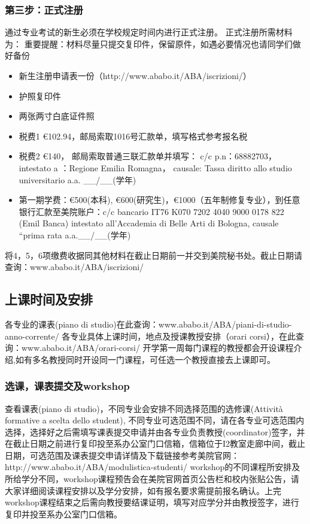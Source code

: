 \documentclass[3pt,a5paper,openright,twoside]{book}
\begin{document}
\subsubsection{第三步：正式注册}
通过专业考试的新生必须在学校规定时间内进行正式注册。
正式注册所需材料为：
重要提醒：材料尽量只提交复印件，保留原件，如遇必要情况也请同学们做好备份

\begin{itemize}
  \item 新生注册申请表一份（http://www.ababo.it/ABA/iscrizioni/）
  \item 护照复印件
  \item 两张两寸白底证件照
  \item 税费1 €102.94，邮局索取1016号汇款单，填写格式参考报名税
  \item 税费2 €140， 邮局索取普通三联汇款单并填写：                                                              c/c p.n：68882703，intestato a ：Regione Emilia Romagna， causale: Tassa diritto allo studio universitario a.a. \_\_/\_\_(学年)
  \item 第一期学费：€500(本科), €600(研究生)，€1000（五年制修复专业），到任意银行汇款至美院账户：c/c bancario IT76 K070 7202 4040 9000 0178 822 (Emil Banca) intestato all’Accademia di Belle Arti di Bologna, causale “prima rata a.a.\_\_/\_\_(学年)
 \end{itemize}

 将4，5，6项缴费收据同其他材料在截止日期前一并交到美院秘书处。截止日期请查询：www.ababo.it/ABA/iscrizioni/


\subsection{上课时间及安排}
各专业的课表(piano di studio)在此查询：www.ababo.it/ABA/piani-di-studio-anno-corrente/ 
各专业具体上课时间，地点及授课教授安排（orari corsi），在此查询：www.ababo.it/ABA/orari-corsi/
开学第一周每门课程的教授都会开设课程介绍,如有多名教授同时开设同一门课程，可任选一个教授直接去上课即可。


\subsubsection{选课，课表提交及workshop}
查看课表(piano di studio)，不同专业会安排不同选择范围的选修课(Attività formative a scelta dello student), 不同专业可选范围不同，请在各专业可选范围内选择，选择好之后需填写课表提交申请并由各专业负责教授(coordinator)签字，并在截止日期之前进行复印投至系办公室门口信箱，信箱位于I2教室走廊中间，截止日期，可选范围及课表提交申请详情及下载链接参考美院官网：http://www.ababo.it/ABA/modulistica-studenti/
workshop的不同课程所安排及所给学分不同，workshop课程预告会在美院官网首页公告栏和校内张贴公告，请大家详细阅读课程安排以及学分安排，如有报名要求需提前报名确认。上完workshop课程结束之后需向教授要结课证明，填写对应学分并由教授签字，进行复印并投至系办公室门口信箱。
\end{document}
